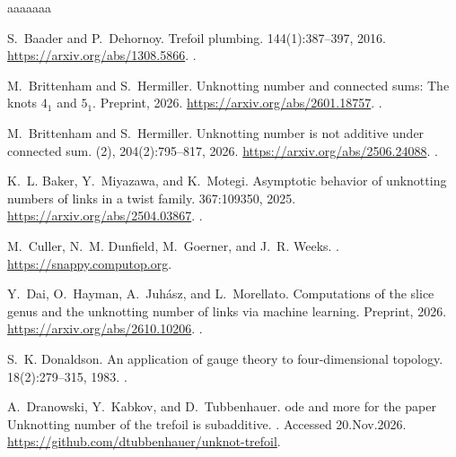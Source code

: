 \documentclass[a4paper,11pt]{amsart}
\numberwithin{equation}{subsection}
\theoremstyle{plain}
\theoremstyle{remark}
\begin{document}
\begin{thebibliography}{aaaaaaa}

S.~Baader and P.~Dehornoy.
\newblock Trefoil plumbing.
 144(1):387--397, 2016.
\newblock \url{https://arxiv.org/abs/1308.5866}.
\newblock \href{https://doi.org/10.1090/proc/12561}
{}.

M.~Brittenham and S.~Hermiller.
\newblock Unknotting number and connected sums: The knots {$4_1$} and {$5_1$}.
\newblock Preprint, 2026.
\newblock \url{https://arxiv.org/abs/2601.18757}.
\newblock \href{https://doi.org/10.48550/arXiv.2601.18757}{}.

M.~Brittenham and S.~Hermiller.
\newblock Unknotting number is not additive under connected sum.
 (2), 204(2):795--817, 2026.
\newblock \url{https://arxiv.org/abs/2506.24088}.
\newblock \href{https://doi.org/10.4007/annals.2026.204.2.7}{}.

K.~L. Baker, Y.~Miyazawa, and K.~Motegi.
\newblock Asymptotic behavior of unknotting numbers of links in a twist family.
 367:109350, 2025.
\newblock \url{https://arxiv.org/abs/2504.03867}.
\newblock \href{https://doi.org/10.1016/j.topol.2025.109350}{}.

M.~Culler, N.~M. Dunfield, M.~Goerner, and J.~R. Weeks.
.
\newblock \url{https://snappy.computop.org}.

Y.~Dai, O.~Hayman, A.~Juh\'asz, and L.~Morellato.
\newblock Computations of the slice genus and the unknotting number of links via machine learning.
\newblock Preprint, 2026.
\newblock \url{https://arxiv.org/abs/2610.10206}.
\newblock \href{https://doi.org/10.48550/arXiv.2610.10206}{}.

S.~K. Donaldson.
\newblock An application of gauge theory to four-dimensional topology.
 18(2):279--315, 1983.
\newblock \href{https://doi.org/10.4310/jdg/1214437665}{}.

A.~Dranowski, Y.~Kabkov, and D.~Tubbenhauer.
ode and more for the paper {U}nknotting number of the trefoil is subadditive.
. Accessed 20.Nov.2026.
\newblock \url{https://github.com/dtubbenhauer/unknot-trefoil}.


\end{thebibliography}
\end{document}
